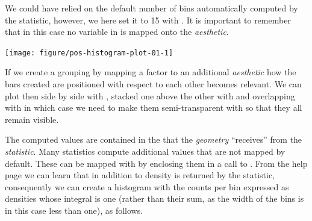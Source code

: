 \documentclass[krantz2]{krantz}\usepackage{knitr}%
\begin{document}
We could have relied on the default number of bins automatically computed by the  statistic, however, we here set it to 15 with . It is important to remember that in this case no variable in  is mapped onto the  \emph{aesthetic}.

\begin{knitrout}\footnotesize
{}\color{fgcolor}\begin{kframe}
\begin{alltt}
  \hlopt{+}
  \hlstd{(} \hlstd{=} \hlstd{)}
\end{alltt}
\end{kframe}

{\centering \texttt{[image: figure/pos-histogram-plot-01-1]} 

}



\end{knitrout}

If we create a grouping by mapping a factor to an additional \emph{aesthetic} how the bars created are positioned with respect to each other becomes relevant. We can plot then side by side with , stacked one above the other with  and overlapping with  in which case we need to make them semi-transparent with  so that they all remain visible.

\begin{knitrout}\footnotesize
{}\color{fgcolor}\begin{kframe}
\begin{alltt}
    \hlopt{+}
  \hlstd{(} \hlstd{=} \hlstd{,}  \hlstd{=} \hlstd{)}
\end{alltt}
\end{kframe}
\end{knitrout}

The computed values are contained in the  that the \emph{geometry} ``receives'' from the \emph{statistic}. Many statistics compute additional values that are not mapped by default. These can be mapped with  by enclosing them in a call to . From the help page we can learn that in addition to  density  is returned by the statistic, consequently we can create a histogram with the counts per bin expressed as densities whose integral is one (rather than their sum, as the width of the bins is in this case less than one), as follows.
\end{document}
